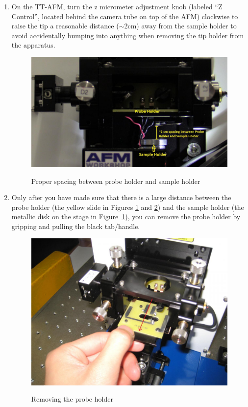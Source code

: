 \documentclass{../lab}
\begin{document}
\begin{enumerate}
    \item On the TT-AFM, turn the z micrometer adjustment knob (labeled ``Z Control'', located behind the camera tube on top of the AFM) clockwise to raise the tip a reasonable distance ($\sim$2cm) away from the sample holder to avoid accidentally bumping into anything when removing the tip holder from the apparatus.

    \begin{figure}[H]
        \centering
        \href{http://experimentationlab.berkeley.edu/sites/default/files/AFMImages/AFMstagespace_0.jpg}{\includegraphics[width=0.95\linewidth]{images/AFMstagespace_0.jpg}}
        \caption{Proper spacing between probe holder and sample holder}
        \label{fig:AFMStageSpace}
    \end{figure}
    
    \item Only after you have made sure that there is a large distance between the probe holder (the yellow slide in Figures \ref{fig:AFMStageSpace} and \ref{fig:PullOutYellowSlide}) and the sample holder (the metallic disk on the stage in Figure~\ref{fig:AFMStageSpace}), you can remove the probe holder by gripping and pulling the black tab/handle.

    \begin{figure}[H]
        \centering
        \href{http://experimentationlab.berkeley.edu/sites/default/files/AFMImages/14.JPG}{\includegraphics[width=0.8\linewidth]{images/14.JPG}}
        \caption{Removing the probe holder}
        \label{fig:PullOutYellowSlide}
    \end{figure}


\end{enumerate}
\end{document}
